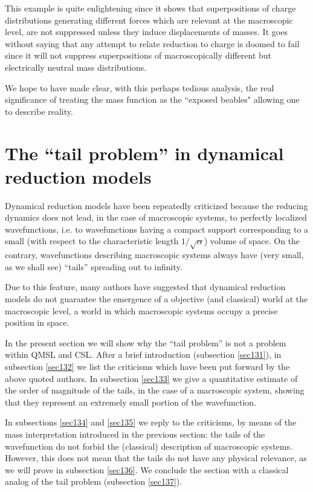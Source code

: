 \documentclass[10pt,a4paper]{article}
\begin{document}
This example is quite enlightening since it shows that
superpositions of charge distributions generating different forces
which are relevant at the macroscopic level, are not suppressed
unless they induce displacements of masses. It goes without saying
that any attempt to relate reduction to charge is doomed to fail
since it will not suppress superpositions of macroscopically
different but electrically neutral mass distributions.

We hope to have made clear, with this perhaps tedious analysis,
the real significance of treating the mass function as the
``exposed beables" allowing one to describe reality.



\section{The ``tail problem'' in dynamical reduction models}
\label{sec013}

Dynamical reduction models have been repeatedly criticized because
the reducing dynamics does not lead, in the case of macroscopic
systems, to perfectly localized wavefunctions, i.e. to
wavefunctions having a compact support corresponding to a small
(with respect to the characteristic length $1/\sqrt{\alpha}$)
volume of space. On the contrary, wavefunctions describing
macroscopic systems always have (very small, as we shall see)
``tails'' spreading out to infinity.

Due to this feature, many authors \cite{shi90,alo1,lew,cli1,cli2}
have suggested that dynamical reduction models do not guarantee
the emergence of a objective (and classical) world at the
macroscopic level, a world in which macroscopic systems occupy a
precise position in space.

In the present section we will show why the ``tail problem'' is
not a problem within QMSL and CSL. After a brief introduction
(subsection \ref{sec131}), in subsection \ref{sec132} we list the
criticisms which have been put forward by the above quoted
authors. In subsection \ref{sec133} we give a quantitative
estimate of the order of magnitude of the tails, in the case of a
macroscopic system, showing that they represent an extremely small
portion of the wavefunction.

In subsections \ref{sec134} and \ref{sec135} we reply to the
criticisms, by means of the mass interpretation introduced in the
previous section: the tails of the wavefunction do not forbid the
(classical) description of macroscopic systems. However, this does
not mean that the tails do not have any  physical relevance, as we
will prove in subsection \ref{sec136}. We conclude the section
with a classical analog of the tail problem (subsection
\ref{sec137}).
\end{document}
